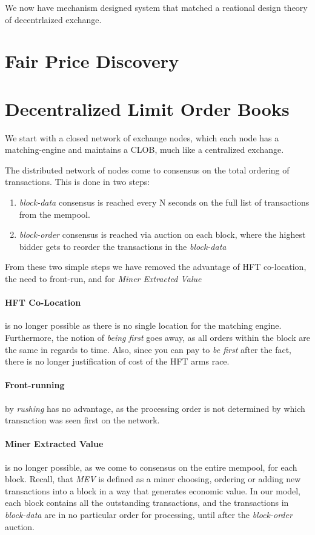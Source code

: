 \documentclass[12pt]{article}
\begin{document}
We now have mechanism designed system that matched a reational design theory of decentrlaized exchange. 

\section{Fair Price Discovery} 

\section{Decentralized Limit Order Books}
We start with a closed network of exchange nodes, which each node has a matching-engine and maintains a CLOB, much like a centralized exchange. 

The distributed network of nodes come to consensus on the total ordering of transactions. This is done in two steps: 

\begin{enumerate}
    \item \emph{block-data} consensus is reached every N seconds on the full list of transactions from the mempool. 
    \item \emph{block-order} consensus is reached via auction on each block, where the highest bidder gets to reorder the transactions in the \emph{block-data} 
\end{enumerate}

From these two simple steps we have removed the advantage of HFT co-location, the need to front-run, and for \emph{Miner Extracted Value}

\paragraph*{HFT Co-Location} is no longer possible as there is no single location for the matching engine. Furthermore, the notion of \emph{being first} goes away, as all orders within the block are the same in regards to time. Also, since you can pay to \emph{be first} after the fact, there is no longer justification of cost of the HFT arms race. 

\paragraph*{Front-running} by \emph{rushing} has no advantage, as the processing order is not determined by which transaction was seen first on the network. 

\paragraph*{Miner Extracted Value} is no longer possible, as we come to consensus on the entire mempool, for each block. Recall, that \emph{MEV} is defined as a miner choosing, ordering or adding new transactions into a block in a way that generates economic value.  In our model, each block contains all the outstanding transactions, and the transactions in \emph{block-data} are in no particular order for processing, until after the \emph{block-order} auction. 
\end{document}
